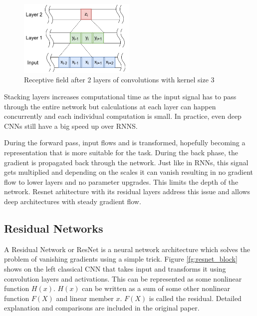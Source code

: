\documentclass[times, utf8, diplomski, numeric, english]{fer}
\begin{document}
\begin{figure}[!ht]
	\begin{center}
		\includegraphics[width=0.5\textwidth]{./imgs/receptive_field.png}
		\caption{Receptive field after 2 layers of convolutions with kernel size 3}
		\label{fg:receptive field}
	\end{center}
\end{figure}
Stacking layers increases computational time as the input signal has to pass through the entire network but calculations at each layer can happen concurrently and each individual computation is small.
In practice, even deep CNNs still have a big speed up over RNNS.

During the forward pass, input flows and is transformed, hopefully becoming a representation that is more suitable for the task. During the back phase, the gradient is propagated back through the network. Just like in RNNs, this signal gets multiplied and depending on the scales it can vanish resulting in no gradient flow to lower layers and no parameter upgrades. This limits the depth of the network. Resnet arhitecture \cite{resnet} with its residual layers address this issue and allows deep architectures with steady gradient flow.




\subsection{Residual Networks}
A Residual Network or ResNet is a neural network architecture which solves the problem of vanishing gradients using a simple trick.  
Figure \ref{fg:resnet_block}  shows on the left classical CNN that takes input and transforms it using convolution layers and activations.  This can be represented as some nonlinear function $ H(x) $. $ H(x) $ can be written as a sum of some other nonlinear function $F(X)$ and linear member $x$. $F(X) $ is called the residual. Detailed explanation and comparisons are included in the original paper.
\end{document}

